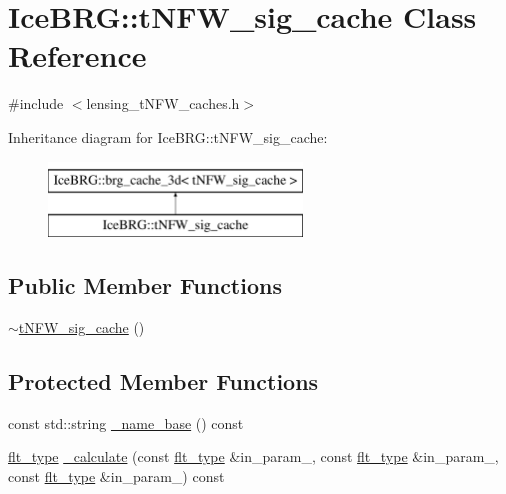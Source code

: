 \hypertarget{classIceBRG_1_1tNFW__sig__cache}{}\section{Ice\+B\+R\+G\+:\+:t\+N\+F\+W\+\_\+sig\+\_\+cache Class Reference}
\label{classIceBRG_1_1tNFW__sig__cache}


{\ttfamily \#include $<$lensing\+\_\+t\+N\+F\+W\+\_\+caches.\+h$>$}

Inheritance diagram for Ice\+B\+R\+G\+:\+:t\+N\+F\+W\+\_\+sig\+\_\+cache\+:\begin{figure}[H]
\begin{center}
\leavevmode
\includegraphics[height=2.000000cm]{classIceBRG_1_1tNFW__sig__cache}
\end{center}
\end{figure}
\subsection*{Public Member Functions}
\begin{DoxyCompactItemize}
\item 
\hyperlink{classIceBRG_1_1tNFW__sig__cache_a5debb1198b2d0a1d53e8c8deb43f6a5a}{$\sim$t\+N\+F\+W\+\_\+sig\+\_\+cache} ()
\end{DoxyCompactItemize}
\subsection*{Protected Member Functions}
\begin{DoxyCompactItemize}
\item 
const std\+::string \hyperlink{classIceBRG_1_1tNFW__sig__cache_a2a2c3ab5ce403a9718796b15a9cff55c}{\+\_\+name\+\_\+base} () const 
\item 
\hyperlink{lib_2IceBRG__main_2common_8h_ad0f130a56eeb944d9ef2692ee881ecc4}{flt\+\_\+type} \hyperlink{classIceBRG_1_1tNFW__sig__cache_ae26a90e0eda69be614a622816629cc76}{\+\_\+calculate} (const \hyperlink{lib_2IceBRG__main_2common_8h_ad0f130a56eeb944d9ef2692ee881ecc4}{flt\+\_\+type} \&in\+\_\+param\+\_, const \hyperlink{lib_2IceBRG__main_2common_8h_ad0f130a56eeb944d9ef2692ee881ecc4}{flt\+\_\+type} \&in\+\_\+param\+\_, const \hyperlink{lib_2IceBRG__main_2common_8h_ad0f130a56eeb944d9ef2692ee881ecc4}{flt\+\_\+type} \&in\+\_\+param\+\_) const 
\end{DoxyCompactItemize}
